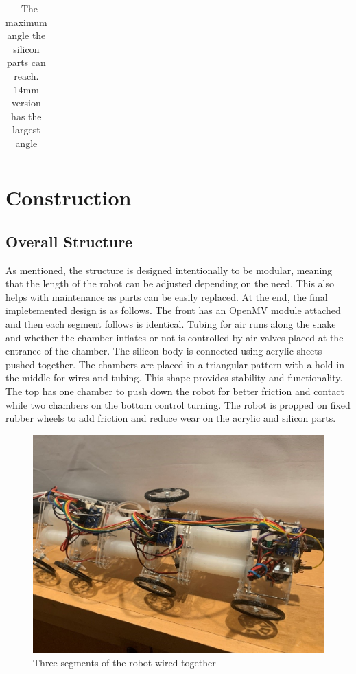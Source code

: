 \documentclass[twoside]{article}
\begin{document}
\begin{table} [H]
\begin{tabular}{|c|c|}
	\hline
	\end{tabular}
	\caption{- The maximum angle the silicon parts can reach. 14mm version has the largest angle}
\end{table}

\section{Construction}

\subsection{Overall Structure}
As mentioned, the structure is designed intentionally to be modular, meaning that the length of the robot can be adjusted depending on the need. This also helps with maintenance as parts can be easily replaced. At the end, the final impletemented design is as follows. The front has an OpenMV module attached and then each segment follows is identical. Tubing for air runs along the snake and whether the chamber inflates or not is controlled by air valves placed at the entrance of the chamber. The silicon body is connected using acrylic sheets pushed together. The chambers are placed in a triangular pattern with a hold in the middle for wires and tubing. This shape provides stability and functionality. The top has one chamber to push down the robot for better friction and contact while two chambers on the bottom control turning. The robot is propped on fixed rubber wheels to add friction and reduce wear on the acrylic and silicon parts. 

\begin{figure} [H]
	\centering
	\includegraphics{completed_snake}
	\caption{Three segments of the robot wired together}
\end{figure}
\end{document}
